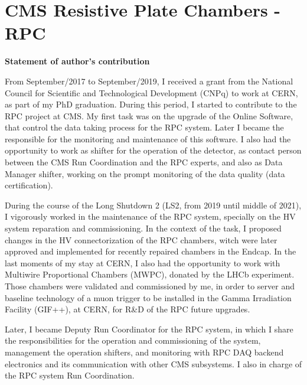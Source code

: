 \chapter{CMS Resistive Plate Chambers - RPC}
\label{chapter_rpc}

\begin{tcolorbox}
    {\footnotesize 
    \textbf{Statement of author's contribution}

    \vspace{1em}
    From September/2017 to September/2019, I received a grant from the National Council for Scientific and Technological Development (CNPq) to work at CERN, as part of my PhD graduation. During this period, I started to contribute to the RPC project at CMS. My first task was on the upgrade of the Online Software, that control the data taking process for the RPC system. Later I became the responsible for the monitoring and maintenance of this software. I also had the opportunity to work as shifter for the operation of the detector, as contact person between the CMS Run Coordination and the RPC experts, and also as Data Manager shifter, working on the prompt monitoring of the data quality (data certification). 
    
    \vspace{1em}
    During the course of the Long Shutdown 2 (LS2, from 2019 until middle of 2021), I vigorously worked in the maintenance of the RPC system, specially on the HV system reparation and commissioning. In the context of the task, I proposed changes in the HV connectorization of the RPC chambers, witch were later approved and implemented for recently repaired chambers in the Endcap. In the last moments of my stay at CERN, I also had the opportunity to work with Multiwire Proportional Chambers (MWPC), donated by the LHCb experiment. Those chambers were validated and commissioned by me, in order to server and baseline technology of a muon trigger to be installed in the Gamma Irradiation Facility (GIF++), at CERN, for R\&D of the RPC future upgrades.

    \vspace{1em}
    Later, I became Deputy Run Coordinator for the RPC system, in which I share the responsibilities for the operation and commissioning of the system, management the operation shifters, and monitoring with RPC DAQ backend electronics and its communication with other CMS subsystems. I also in charge of the RPC system Run Coordination. 

    \vspace{1em}
    }
\end{tcolorbox}

